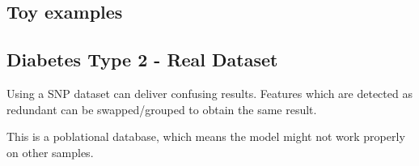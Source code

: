 \subsection{Toy examples}

\subsection{Diabetes Type 2 - Real Dataset}
Using a SNP dataset can deliver confusing results. Features which are detected as redundant can be swapped/grouped to obtain the same result. 

This is a poblational database, which means the model might not work properly on other samples.